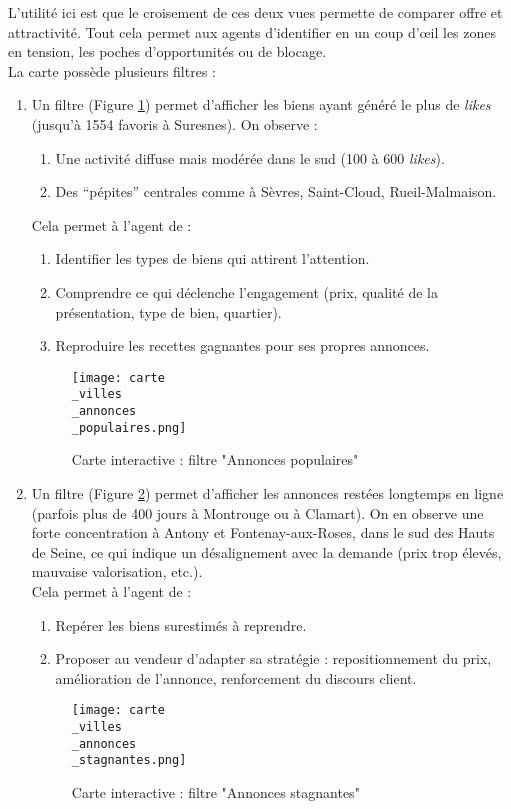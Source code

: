 \documentclass[a4paper, 12pt, twoside]{report}
\begin{document}
		L’utilité ici est que le croisement de ces deux vues permette de comparer offre et attractivité. Tout cela permet aux agents d’identifier en un coup d’œil les zones en tension, les poches d’opportunités ou de blocage. \\

		La carte possède plusieurs filtres :

		\begin{enumerate}
			\item Un filtre (Figure \ref{carteVillesAnnoncesPopulaires}) permet d’afficher les biens ayant généré le plus de {\it likes} (jusqu’à 1554 favoris à Suresnes). On observe : 
			\begin{enumerate}
				\item Une activité diffuse mais modérée dans le sud (100 à 600 {\it likes}).
				\item Des “pépites” centrales comme à Sèvres, Saint-Cloud, Rueil-Malmaison.
			\end{enumerate}
			Cela permet à l’agent de :
			\begin{enumerate}
				\item Identifier les types de biens qui attirent l’attention.
				\item Comprendre ce qui déclenche l’engagement (prix, qualité de la présentation, type de bien, quartier).
				\item Reproduire les recettes gagnantes pour ses propres annonces. \\
			\end{enumerate}
			\begin{figure}[h]
				\centering
				\texttt{[image: carte\\\_villes\\\_annonces\\\_populaires.png]}
				\caption{Carte interactive : filtre "Annonces populaires"}
				\label{carteVillesAnnoncesPopulaires}
			\end{figure}	

			\item Un filtre (Figure \ref{carteVillesAnnoncesStagnantes}) permet d'afficher les annonces restées longtemps en ligne (parfois plus de 400 jours à Montrouge ou à Clamart). On en observe une forte concentration à Antony et Fontenay-aux-Roses, dans le sud des Hauts de Seine, ce qui indique un désalignement avec la demande (prix trop élevés, mauvaise valorisation, etc.). \\
			 Cela permet à l'agent de :
			\begin{enumerate}
				\item Repérer les biens surestimés à reprendre.
				\item Proposer au vendeur d’adapter sa stratégie : repositionnement du prix, amélioration de l’annonce, renforcement du discours client. \\
			\end{enumerate}
			\begin{figure}[h]
				\centering
				\texttt{[image: carte\\\_villes\\\_annonces\\\_stagnantes.png]}
				\caption{Carte interactive : filtre "Annonces stagnantes"}
				\label{carteVillesAnnoncesStagnantes}
			\end{figure}	
		\end{enumerate}
\end{document}
